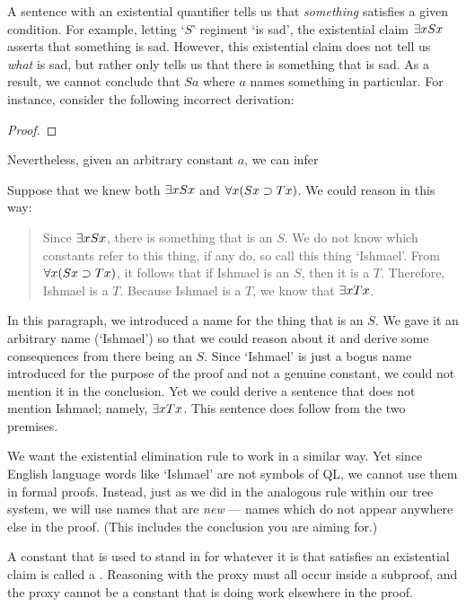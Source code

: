 A sentence with an existential quantifier tells us that \textit{something} satisfies a given condition.
For example, letting `$S$' regiment `is sad', the existential claim $\exists x Sx$ asserts that something is sad.
However, this existential claim does not tell us \textit{what} is sad, but rather only tells us that there is something that is sad.
As a result, we cannot conclude that $Sa$ where $a$ names something in particular.
For instance, consider the following incorrect derivation:

\begin{proof}
	 \pr{}
	 \pr{}
	 
	  
   
   
\end{proof}

Nevertheless, given an arbitrary constant $a$, we can infer 

Suppose that we knew both $\exists x Sx$ and $\forall x(Sx \supset Tx)$. We could reason in this way:
\begin{quote}
Since $\exists x Sx$, there is something that is an $S$. We do not know which constants refer to this thing, if any do, so call this thing `Ishmael'. From $\forall x(Sx \supset Tx)$, it follows that if Ishmael is an $S$, then it is a $T$. Therefore, Ishmael is a $T$.  Because Ishmael is a $T$, we know that $\exists x Tx$.
\end{quote}
In this paragraph, we introduced a name for the thing that is an $S$. We gave it an arbitrary name (`Ishmael') so that we could reason about it and derive some consequences from there being an $S$. Since `Ishmael' is just a bogus name introduced for the purpose of the proof and not a genuine constant, we could not mention it in the conclusion. Yet we could derive a sentence that does not mention Ishmael; namely, $\exists x Tx$. This sentence does follow from the two premises.

We want the existential elimination rule to work in a similar way. Yet since English language words like `Ishmael' are not symbols of QL, we cannot use them in formal proofs. Instead, just as we did in the analogous rule within our tree system, we will use names that are \emph{new} --- names which do not appear anywhere else in the proof. (This includes the conclusion you are aiming for.)

A constant that is used to stand in for whatever it is that satisfies an existential claim is called a . Reasoning with the proxy must all occur inside a subproof, and the proxy cannot be a constant that is doing work elsewhere in the proof.


